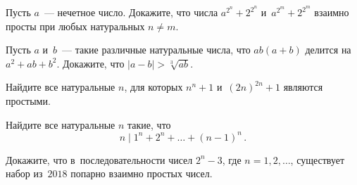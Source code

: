 


\begingroup
    \def\abs#1{\lvert #1 \rvert}%
    \def\divides{\mathrel{\vert}}%

\begin{problems}

\item
Пусть $a$~--- нечетное число.
Докажите, что числа $a^{2^{n}} + 2^{2^{n}}$ и~$a^{2^{m}} + 2^{2^{m}}$ взаимно просты
при любых натуральных $n \neq m$.

\item
Пусть $a$ и~$b$~--- такие различные натуральные числа, что $a b (a + b)$
делится на~$a^2 + a b + b^2$.
Докажите, что $\abs{a - b} > \sqrt[3]{ab}$.

\item
Найдите все натуральные $n$, для которых $n^{n} + 1$ и~$(2n)^{2n} + 1$ являются
простыми.

\item
Найдите все натуральные $n$ такие, что
\[
    n \divides 1^{n} + 2^{n} + \ldots + (n - 1)^{n}
\, . \]

\item
Докажите, что в~последовательности чисел $2^{n} - 3$, где $n = 1, 2, \ldots$,
существует набор из~$2018$ попарно взаимно простых чисел.

\end{problems}

\endgroup %

